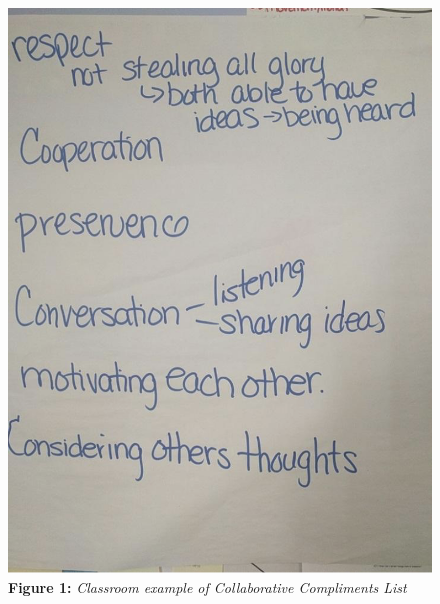 \documentclass[11pt]{sig-alternate}
\begin{document}
\begin{large}
\begin{figure}[h!]
    \centering
    \captionsetup{font=large}
    \caption*{\textbf{Figure 1:} \textit{Classroom example of Collaborative Compliments List}}
    \label{Figure 2}
    \includegraphics[width=\columnwidth]{Figure 1a.png}
\end{figure}

\newpage

\end{large}
\end{document}
